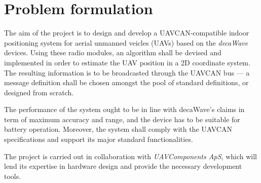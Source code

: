 \section{Problem formulation}\label{sec:problem}

The aim of the project is to design and develop a UAVCAN-compatible indoor positioning system for aerial unmanned veicles (UAVs) based on the \emph{decaWave} devices.
Using these radio modules, an algorithm shall be devised and implemented in order to estimate the UAV position in a 2D coordinate system.
The resulting information is to be broadcasted through the UAVCAN bus --- a message definition shall be chosen amongst the pool of standard definitions, or designed from scratch.

The performance of the system ought to be in line with decaWave's claims in term of maximum accuracy and range, and the device has to be suitable for battery operation.
Moreover, the system shall comply with the UAVCAN specifications and support its major standard functionalities.

The project is carried out in collaboration with \emph{UAVComponents ApS}, which will lend its expertise in hardware design and provide the necessary development tools.
